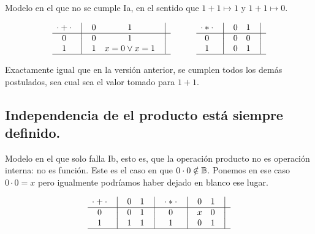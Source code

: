 \documentclass[12pt,a4paper]{article}
\begin{document}
Modelo en el que no se cumple Ia, en el sentido que \(1 + 1
\mapsto 1\) y \(1 + 1 \mapsto 0\).


\[
    \begin{matrix}
        {\cdot + \cdot} & \big{\vert} & {0} & {1} & \big{\vert} \\
        \hline
        {0}             & \big{\vert} & {0} & {1} & \big{\vert} \\
        {1}             & \big{\vert} & {1} & {x=0 \vee x=1} & \big{\vert} \\
        \hline
    \end{matrix}
    \qquad\qquad
    \begin{matrix}
        {\cdot * \cdot} & \big{\vert} & {0} & {1} & \big{\vert} \\
        \hline
        {0}                   & \big{\vert} & {0} & {0} & \big{\vert} \\
        {1}                   & \big{\vert} & {0} & {1} & \big{\vert} \\
        \hline
    \end{matrix}
\]



Exactamente igual que en la versión anterior, se cumplen todos los demás
postulados, sea cual sea el valor tomado para \(1 + 1\).



\subsection{Independencia de el producto está siempre definido.}



	Modelo en el que solo falla Ib, esto es, que la operación
producto no es operación interna: no es función. Este es el caso en que
\( 0 \cdot 0 \notin \mathbb{B} \). Ponemos en ese caso \(0 \cdot 0 = x\) pero
igualmente podríamos haber dejado en blanco ese lugar.



\[
    \begin{matrix}
        {\cdot + \cdot} & \big{\vert} & {0} & {1} & \big{\vert} \\
        \hline
        {0}             & \big{\vert} & {0} & {1} & \big{\vert} \\
        {1}             & \big{\vert} & {1} & {1} & \big{\vert} \\
        \hline
    \end{matrix}
    \quad
    \begin{matrix}
        {\cdot * \cdot} & \big{\vert} & {0} & {1} & \big{\vert} \\
        \hline
        {0}                   & \big{\vert} & {x} & {0} & \big{\vert} \\
        {1}                   & \big{\vert} & {0} & {1} & \big{\vert} \\
        \hline
    \end{matrix}
\]
\end{document}
